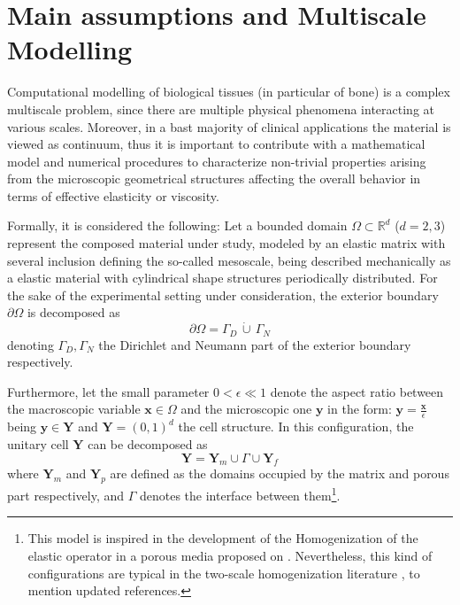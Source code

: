\section{Main assumptions and Multiscale Modelling}

Computational modelling of biological tissues (in particular of bone) is a complex multiscale problem, since there are multiple physical phenomena interacting at various scales. Moreover, in a bast majority of clinical applications the material is viewed as continuum, thus it is important to contribute with a mathematical model and numerical procedures to characterize non-trivial properties arising from the microscopic geometrical structures affecting the overall behavior in terms of effective elasticity or viscosity.

Formally, it is considered the following:
Let a bounded domain $\Omega \subset \mathbb{R}^d$ ($d = 2,3$) represent the composed material under study, modeled by an elastic matrix with several inclusion defining the so-called mesoscale, being described mechanically as a elastic material with cylindrical shape structures periodically distributed.
For the sake of the experimental setting under consideration, the exterior boundary $\partial \Omega$ is decomposed as
\begin{equation*}
	\partial \Omega = \Gamma_D\, \dot \cup \,\Gamma_N
\end{equation*}
denoting $\Gamma_D, \Gamma_N$ the Dirichlet and Neumann part of the exterior boundary respectively.

Furthermore, let the small parameter $0 < \epsilon \ll 1$ denote the aspect ratio between the macroscopic variable $\mathbf{x} \in \Omega$ and the microscopic one $\mathbf{y}$ in the form: $\mathbf{y} = \frac{\mathbf{x}}{\epsilon}$ being $\mathbf{y} \in \mathbf{Y}$ and $\mathbf{Y} = (0,1)^d$ the cell structure. In this configuration, the unitary cell $\mathbf{Y}$ can be decomposed as
\begin{equation*}
	\mathbf{Y} = \mathbf{Y}_m \cup \Gamma \cup \mathbf{Y}_f
\end{equation*}
where $\mathbf{Y}_m$ and $\mathbf{Y}_p$ are defined as the domains occupied by the matrix and porous part respectively, and $\Gamma$ denotes the interface between them\footnote{This model is inspired in the development of the Homogenization of the elastic operator in a porous media proposed on \cite{christensen1982theory}. Nevertheless, this kind of configurations are typical in the two-scale homogenization literature \cite{panasenko2005multi-scale}, \cite{Boughammoura2013} to mention updated references.}.

